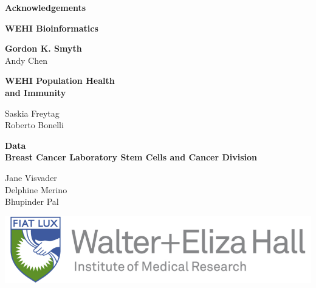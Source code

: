 \documentclass[9pt,t]{beamer}
\begin{document}
\begin{frame}[plain,t]
	\vspace{0.7cm}
	\textbf{\huge{Acknowledgements}}\\
	\vspace{1cm}
	
	\begin{minipage}[t]{0.49\textwidth}
	{\color{oxygenpurple}\textbf{WEHI Bioinformatics}}\\
	\vspace{0.20cm}
	
	\textbf{Gordon K. Smyth}\\
	Andy Chen\\
	\vspace{0.35cm}
	
	{\color{oxygenpurple}\textbf{WEHI Population Health \\and Immunity}}\\
	\vspace{0.20cm}
	
	Saskia Freytag\\
	Roberto Bonelli\\
	\vspace{0.7cm}
	\end{minipage}%
	\begin{minipage}[t]{0.49\textwidth}
	{\color{oxygenpurple}\textbf{Data}}\\	
	{\color{oxygenrose}\textbf{Breast Cancer Laboratory Stem Cells and Cancer Division}}\\
	\vspace{0.20cm}
	
	Jane Visvader\\
	Delphine Merino\\
	Bhupinder Pal
	\vspace{0.75cm}
	
	\includegraphics[width=1\textwidth]{WEHI}
	\vspace{1.35cm}
	
	
	\end{minipage}
\end{frame}

\end{document}
